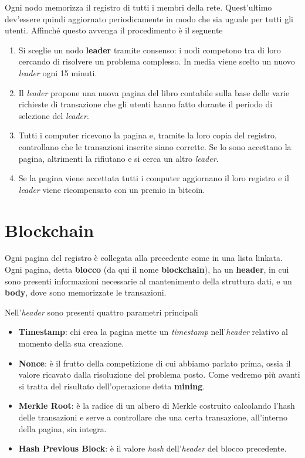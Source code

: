 Ogni nodo memorizza il registro di tutti i membri della rete. Quest'ultimo dev'essere quindi aggiornato periodicamente
in modo che sia uguale per tutti gli utenti. Affinch\'e questo avvenga il procedimento \`e il seguente
\begin{enumerate}
	\item Si sceglie un nodo \textbf{leader} tramite consenso: i nodi competono tra di loro cercando di risolvere un
	      problema complesso. In media viene scelto un nuovo \emph{leader} ogni 15 minuti.
	\item Il \emph{leader} propone una nuova pagina del libro contabile sulla base delle varie richieste di transazione
	      che gli utenti hanno fatto durante il periodo di selezione del \emph{leader}.
	\item Tutti i computer ricevono la pagina e, tramite la loro copia del registro, controllano che le transazioni
	      inserite siano corrette. Se lo sono accettano la pagina, altrimenti la rifiutano e si cerca un altro
	      \emph{leader}.
	\item Se la pagina viene accettata tutti i computer aggiornano il loro registro e il \emph{leader} viene ricompensato
	      con un premio in bitcoin.
\end{enumerate}

\section{Blockchain}
Ogni pagina del registro \`e collegata alla precedente come in una lista linkata. Ogni pagina, detta \textbf{blocco}
(da qui il nome \textbf{blockchain}), ha un \textbf{header}, in cui sono presenti informazioni necessarie al
mantenimento della struttura dati, e un \textbf{body}, dove sono memorizzate le transazioni.

Nell'\emph{header} sono presenti quattro parametri principali
\begin{itemize}
	\item \textbf{Timestamp}: chi crea la pagina mette un \emph{timestamp} nell'\emph{header} relativo al momento
	      della sua creazione.
	\item \textbf{Nonce}: \`e il frutto della competizione di cui abbiamo parlato prima, ossia il valore ricavato
	      dalla risoluzione del problema posto. Come vedremo pi\`u avanti si tratta del risultato dell'operazione
	      detta \textbf{mining}.
	\item \textbf{Merkle Root}: \`e la radice di un albero di Merkle costruito calcolando l'hash delle transazioni
	      e serve a controllare che una certa transazione, all'interno della pagina, sia integra.
	\item \textbf{Hash Previous Block}: \`e il valore \emph{hash} dell'\emph{header} del blocco precedente.
\end{itemize}

